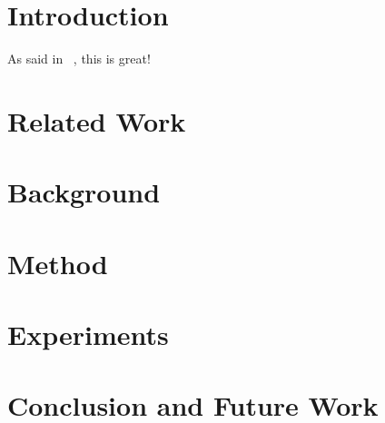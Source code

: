 \section{Introduction}

As said in ~, this is great!

\section{Related Work}

\section{Background}

\section{Method}

\section{Experiments}

\section{Conclusion and Future Work}

\FloatBarrier
